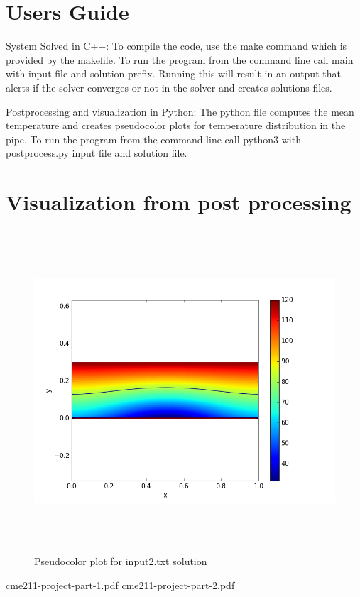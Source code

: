 \documentclass{article}
\begin{document}
\section{Users Guide}
System Solved in C++:
To compile the code, use the make command which is provided by the makefile.
To run the program from the command line call main with input file and
solution prefix. Running this will result in an output that alerts if the
solver converges or not in the solver and creates solutions files.

Postprocessing and visualization in Python:
The python file computes the mean temperature and creates pseudocolor plots
for temperature distribution in the pipe.
To run the program from the command line call python3 with postprocess.py
input file and solution file. 

\section{Visualization from post processing}
\begin{figure}
  \centering
  \includegraphics[width = 15cm, height = 12cm]{plot.png}
  \caption{Pseudocolor plot for input2.txt solution}
\end{figure}

\pagebreak

\begin{thebibliography}{5}
 cme211-project-part-1.pdf
 cme211-project-part-2.pdf
\end{thebibliography}
  
\end{document}
